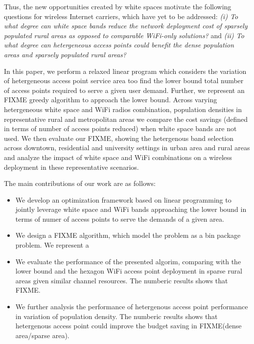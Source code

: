 Thus, the new opportunities created by white spaces motivate the following 
questions for wireless Internet carriers, which have yet to be addressed: 
{\it (i) To what degree can white space bands reduce the network deployment cost of
sparsely populated rural areas as opposed to comparable WiFi-only solutions?} and 
{\it (ii) To what degree can hetergeneous access points could benefit the dense 
population areas and sparsely populated rural areas?}

In this paper, we perform a relaxed linear program which considers the 
variation of hetergeneous access point service area too find the lower bound
total number of access points required to serve a given user demand. Further,
we represent an FIXME greedy algorithm to approach the lower bound.  
Across varying hetergeneous white space and WiFi radios combination, population 
densities in representative rural and metropolitan areas we compare the 
cost savings (defined in terms of number of access points reduced) when 
white space bands are not used. We then evaluate our FIXME, showing
the hetergenous band selection across downtown, residential and university settings in
urban area and rural areas and analyze the impact of white space and WiFi
combinations on a wireless deployment in these representative scenarios.

The main contributions of our work are as follows:
\begin{itemize}
\item We develop an optimization framework based on linear programming to jointly leverage white space and WiFi 
bands approaching the lower bound in terms of numer of access points to serve the demands of a given area.
\item We design a FIXME algorithm, which model the problem as a bin package problem. We represent a 
\item We evaluate the performance of the presented algorim, comparing with the lower bound and the hexagon
WiFi access point deployment in sparse rural areas given similar channel resources. The numberic results shows that FIXME.  
\item We further analysis the performance of hetergenous access point performance in variation of population density. The
numberic results shows that hetergenous access point could improve the budget saving in FIXME(dense area/sparse area). 
\end{itemize}


